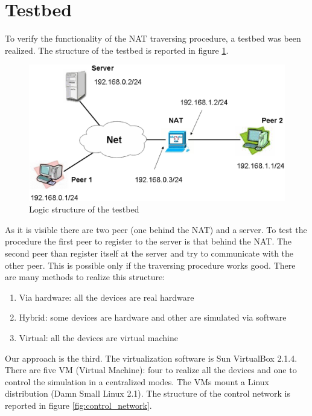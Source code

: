 \section{Testbed}
\label{sec:testbed}
To verify the functionality of the NAT traversing procedure, a testbed was been realized. The structure of the testbed is reported in figure \ref{fig:testbed_structure}.
\begin{figure}[htbp]
	\centering
		\includegraphics[scale=0.4]{testbed_structure.eps}
	\caption[Structure of the testbed]{Logic structure of the testbed}	
	\label{fig:testbed_structure}
\end{figure}
As it is visible there are two peer (one behind the NAT) and a server.
To test the procedure the first peer to register to the server is that behind the NAT. The second peer than register itself at the server and try to communicate with the other peer. This is possible only if the traversing procedure works good. There are many methods to realize this structure:
\begin{enumerate}
	\item Via hardware: all the devices are real hardware
	\item Hybrid: some devices are hardware and other are simulated via software
	\item Virtual: all the devices are virtual machine
\end{enumerate}
Our approach is the third. The virtualization software is Sun VirtualBox 2.1.4. There are five VM (Virtual Machine): four to realize all the devices and one to control the simulation in a centralized modes. The VMs mount a Linux distribution (Damn Small Linux 2.1).
The structure of the control network is reported in figure \ref{fig:control_network}.
